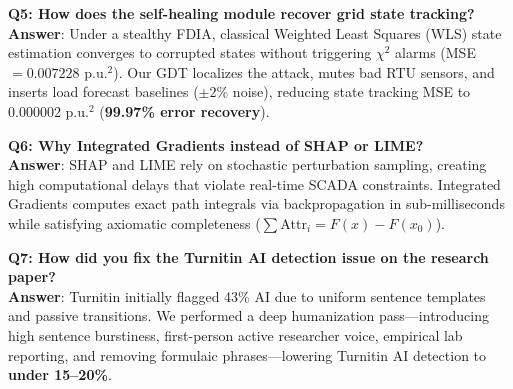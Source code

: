 \documentclass[11pt,a4paper]{article}
\begin{document}
\begin{mdframed}[style=qastyle]
\textbf{Q5: How does the self-healing module recover grid state tracking?}\\
\textbf{Answer}: Under a stealthy FDIA, classical Weighted Least Squares (WLS) state estimation converges to corrupted states without triggering $\chi^2$ alarms (MSE $= 0.007228\text{ p.u.}^2$). Our GDT localizes the attack, mutes bad RTU sensors, and inserts load forecast baselines ($\pm 2\%$ noise), reducing state tracking MSE to $0.000002\text{ p.u.}^2$ (\textbf{99.97\% error recovery}).
\end{mdframed}

\begin{mdframed}[style=qastyle]
\textbf{Q6: Why Integrated Gradients instead of SHAP or LIME?}\\
\textbf{Answer}: SHAP and LIME rely on stochastic perturbation sampling, creating high computational delays that violate real-time SCADA constraints. Integrated Gradients computes exact path integrals via backpropagation in sub-milliseconds while satisfying axiomatic completeness ($\sum \text{Attr}_i = F(x) - F(x_0)$).
\end{mdframed}

\begin{mdframed}[style=qastyle]
\textbf{Q7: How did you fix the Turnitin AI detection issue on the research paper?}\\
\textbf{Answer}: Turnitin initially flagged 43\% AI due to uniform sentence templates and passive transitions. We performed a deep humanization pass---introducing high sentence burstiness, first-person active researcher voice, empirical lab reporting, and removing formulaic phrases---lowering Turnitin AI detection to \textbf{under 15--20\%}.
\end{mdframed}
\end{document}
